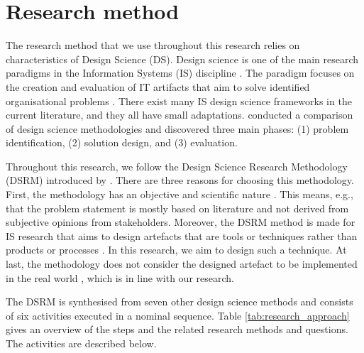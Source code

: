 \section{Research method}\label{s:method}
The research method that we use throughout this research relies on characteristics of Design Science (DS). Design science is one of the main research paradigms in the Information Systems (IS) discipline \cite{hevner2004design}. The paradigm focuses on the creation and evaluation of IT artifacts that aim to solve identified organisational problems \cite{hevner2004design}. There exist many IS design science frameworks in the current literature, and they all have small adaptations. \citeauthor{offermann2009outline} \cite{offermann2009outline} conducted a comparison of design science methodologies and discovered three main phases: (1) problem identification, (2) solution design, and (3) evaluation. \par

Throughout this research, we follow the Design Science Research Methodology (DSRM) introduced by \citeauthor{peffers2007design} \cite{peffers2007design}. There are three reasons for choosing this methodology. First, the methodology has an objective and scientific nature \cite{venable2017choosing}. This means, e.g., that the problem statement is mostly based on literature and not derived from subjective opinions from stakeholders. Moreover, the DSRM method is made for IS research that aims to design artefacts that are tools or techniques rather than products or processes \cite{venable2017choosing}. In this research, we aim to design such a technique. At last, the methodology does not consider the designed artefact to be implemented in the real world \cite{venable2017choosing}, which is in line with our research. \par

The DSRM is synthesised from seven other design science methods and consists of six activities executed in a nominal sequence. Table \ref{tab:research_approach} gives an overview of the steps and the related research methods and questions. The activities are described below. \par



